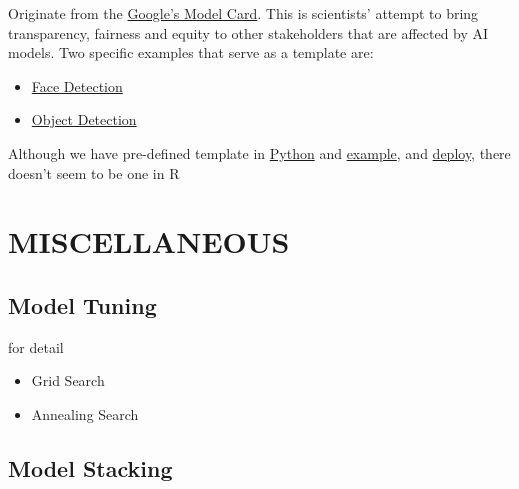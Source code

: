 \documentclass[
]{book}
\newenvironment{Shaded}{\begin{snugshade}}{\end{snugshade}}
\newcommand{\AttributeTok}[1]{\textcolor[rgb]{0.77,0.63,0.00}{#1}}
\newcommand{\ConstantTok}[1]{\textcolor[rgb]{0.00,0.00,0.00}{#1}}
\newcommand{\FunctionTok}[1]{\textcolor[rgb]{0.00,0.00,0.00}{#1}}
\newcommand{\NormalTok}[1]{#1}
\newcommand{\SpecialCharTok}[1]{\textcolor[rgb]{0.00,0.00,0.00}{#1}}
\newcommand{\StringTok}[1]{\textcolor[rgb]{0.31,0.60,0.02}{#1}}
\providecommand{\tightlist}{%
  \setlength{\itemsep}{0pt}\setlength{\parskip}{0pt}}
\begin{document}
Originate from the \citep{Mitchell_2019}
\href{https://modelcards.withgoogle.com/about}{Google's Model Card}. This is scientists' attempt to bring transparency, fairness and equity to other stakeholders that are affected by AI models. Two specific examples that serve as a template are:

\begin{itemize}
\tightlist
\item
  \href{https://modelcards.withgoogle.com/face-detection}{Face Detection}\\
\item
  \href{https://modelcards.withgoogle.com/object-detection}{Object Detection}
\end{itemize}

Although we have pre-defined template in \href{https://github.com/tensorflow/model-card-toolkit}{Python} and \href{https://www.googlenewsapp.com/using-model-card-toolkit-for-tf-model-transparency/}{example}, and \href{https://cloud.google.com/blog/products/ai-machine-learning/create-a-model-card-with-scikit-learn}{deploy}, there doesn't seem to be one in R

\hypertarget{part-miscellaneous}{%
\part{MISCELLANEOUS}\label{part-miscellaneous}}

\hypertarget{model-tuning}{%
\chapter{Model Tuning}\label{model-tuning}}

\begin{Shaded}
\end{Shaded}

\citep{Kuhn_2014} for detail

\begin{itemize}
\tightlist
\item
  Grid Search
\item
  Annealing Search
\end{itemize}

\hypertarget{model-stacking}{%
\chapter{Model Stacking}\label{model-stacking}}
\end{document}
